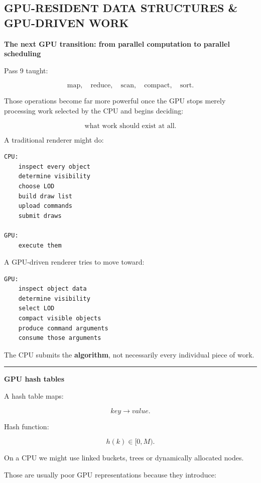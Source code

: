 \subsection{GPU-RESIDENT DATA STRUCTURES \& GPU-DRIVEN WORK}\label{05-engine-i-ch019-gpu-resident-data-structures-gpu-driven-work}

\textbf{The next GPU transition: from parallel computation to parallel scheduling}

Pass 9 taught:

\[
\text{map},
\quad
\text{reduce},
\quad
\text{scan},
\quad
\text{compact},
\quad
\text{sort}.
\]

Those operations become far more powerful once the GPU stops merely processing work selected by the CPU and begins deciding:

\[
\boxed{
\text{what work should exist at all}.
}
\]

A traditional renderer might do:

\protect{}\label{p10-cpu-driven}%
\begin{verbatim}
CPU:
    inspect every object
    determine visibility
    choose LOD
    build draw list
    upload commands
    submit draws

GPU:
    execute them
\end{verbatim}

A GPU-driven renderer tries to move toward:

\protect{}\label{p10-gpu-driven}%
\begin{verbatim}
GPU:
    inspect object data
    determine visibility
    select LOD
    compact visible objects
    produce command arguments
    consume those arguments
\end{verbatim}

The CPU submits the \textbf{algorithm}, not necessarily every individual piece of work.

\begin{center}\rule{0.5\linewidth}{0.5pt}\end{center}

\textbf{GPU hash tables}

A hash table maps:

\[
key\rightarrow value.
\]

Hash function:

\[
h(k)\in[0,M).
\]

On a CPU we might use linked buckets, trees or dynamically allocated nodes.

Those are usually poor GPU representations because they introduce:

